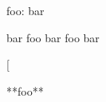 
\def\mytitle{Variables}
\def\foo{bar foo bar foo bar}
\def\bat{**foo**}


foo:	bar

bar foo bar foo bar

[%

**foo**




